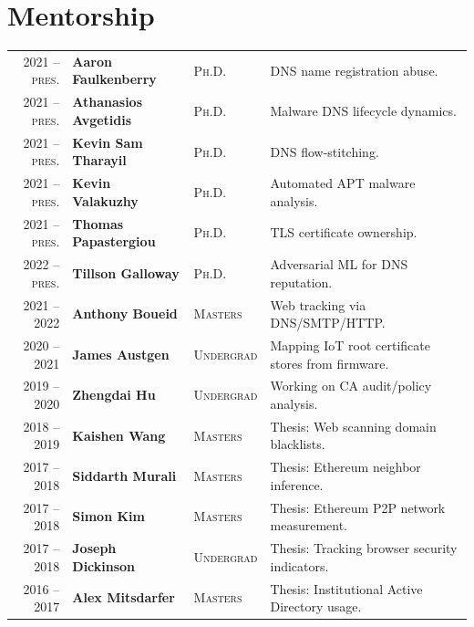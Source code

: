 \documentclass[10pt,singlecolumn]{article} %
\begin{document}
\section{Mentorship} 
\begin{tabular}{rlll}
2021 -- \textsc{pres.} & \textbf{Aaron Faulkenberry} & \textsc{Ph.D.} & DNS name registration abuse.\\ 
2021 -- \textsc{pres.} & \textbf{Athanasios Avgetidis} & \textsc{Ph.D.} & Malware DNS lifecycle dynamics.\\ 
2021 -- \textsc{pres.} & \textbf{Kevin Sam Tharayil} & \textsc{Ph.D.} & DNS flow-stitching.\\ 
2021 -- \textsc{pres.} & \textbf{Kevin Valakuzhy} & \textsc{Ph.D.} & Automated APT malware analysis.\\ 
2021 -- \textsc{pres.} & \textbf{Thomas Papastergiou} & \textsc{Ph.D.} & TLS certificate ownership.\\ 
2022 -- \textsc{pres.} & \textbf{Tillson Galloway} & \textsc{Ph.D.} & Adversarial ML for DNS reputation.\\ 
2021 -- 2022			 & \textbf{Anthony Boueid} & \textsc{Masters} & Web tracking via DNS/SMTP/HTTP.\\ 
2020 -- 2021             & \textbf{James Austgen} & \textsc{Undergrad} & Mapping IoT root certificate stores from firmware.\\ 
2019 -- 2020	         & \textbf{Zhengdai Hu} & \textsc{Undergrad} & Working on CA audit/policy analysis.\\ 
2018 -- 2019	         & \textbf{Kaishen Wang} & \textsc{Masters} & Thesis: Web scanning domain blacklists.\\
2017 -- 2018	         & \textbf{Siddarth Murali} & \textsc{Masters} & Thesis: Ethereum neighbor inference.\\ 
2017 -- 2018	         & \textbf{Simon Kim} & \textsc{Masters} & Thesis: Ethereum P2P network measurement.\\  
2017 -- 2018	         & \textbf{Joseph Dickinson} & \textsc{Undergrad} & Thesis: Tracking browser security indicators.\\  
2016 -- 2017	         & \textbf{Alex Mitsdarfer} & \textsc{Masters} & Thesis: Institutional Active Directory usage.\\ 
\end{tabular}\\



\end{document}
